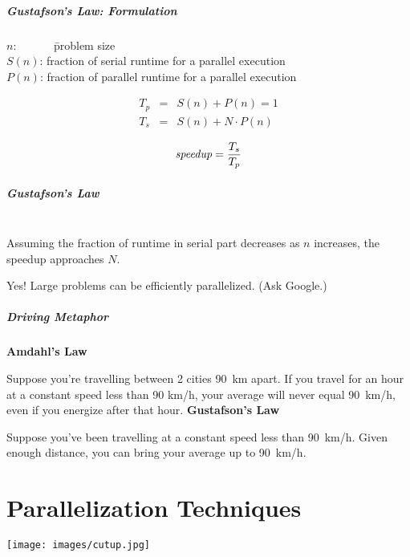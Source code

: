 \begin{frame}
  \frametitle{Gustafson's Law: Formulation}

\hspace*{2em} 
\begin{tabbing}
  $n$:~~~~~~ \= problem size\\[.1em]

  $S(n)$: \> fraction of serial runtime for a parallel execution\\[.1em]

  $P(n)$: \> fraction of parallel runtime for a parallel execution\\
\end{tabbing}


\begin{eqnarray*}
T_p &=& S(n) + P(n) = 1 \\
T_s &=& S(n) + N \cdot P(n) 
\end{eqnarray*}

\[ \mbox{\em speedup} = \frac{T_s}{T_p} \]
\end{frame}

\begin{frame}
  \frametitle{Gustafson's Law}

\hspace*{2em}
  \\[1em]

  Assuming the fraction of runtime in serial part decreases as $n$ increases,
  the speedup approaches $N$.


Yes! Large problems can be efficiently parallelized. (Ask Google.)

\end{frame}

\begin{frame}
  \frametitle{Driving Metaphor}

  {\bf Amdahl's Law}
  
  Suppose you're travelling between 2 cities 90~km apart. If you travel for an
  hour at a constant speed less than 90 km/h, your average will never equal
  90~km/h, even if you energize after that hour.
  \vfill
  {\bf Gustafson's Law}

  Suppose you've been travelling at a constant speed less than 90~km/h. Given
  enough distance, you can bring your average up to 90~km/h.
\end{frame}

\part{Parallelization Techniques}
\begin{frame}
\partpage
\begin{center}
	\texttt{[image: images/cutup.jpg]}
\end{center}
\end{frame}


